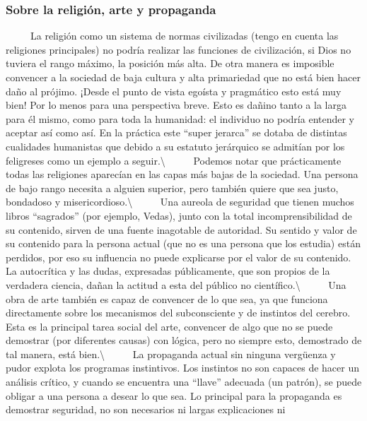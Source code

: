 \protect\hypertarget{M25}{}{}

\subsubsection{Sobre la religión, arte y
propaganda}\label{sobre-la-religiuxf3n-arte-y-propaganda}

~ ~ ~ La religión como un sistema de normas civilizadas (tengo en cuenta
las religiones principales) no podría realizar las funciones de
civilización, si Dios no tuviera el rango máximo, la posición más alta.
De otra manera es imposible convencer a la sociedad de baja cultura y
alta primariedad que no está bien hacer daño al prójimo. ¡Desde el punto
de vista egoísta y pragmático esto está muy bien! Por lo menos para una
perspectiva breve. Esto es dañino tanto a la larga para él mismo, como
para toda la humanidad: el individuo no podría entender y aceptar así
como así. En la práctica este ``super jerarca'' se dotaba de distintas
cualidades humanistas que debido a su estatuto jerárquico se admitían
por los feligreses como un ejemplo a seguir.\textbackslash{} ~ ~ ~
Podemos notar que prácticamente todas las religiones aparecían en las
capas más bajas de la sociedad. Una persona de bajo rango necesita a
alguien superior, pero también quiere que sea justo, bondadoso y
misericordioso.\textbackslash{} ~ ~ ~ Una aureola de seguridad que
tienen muchos libros ``sagrados'' (por ejemplo, Vedas), junto con la
total incomprensibilidad de su contenido, sirven de una fuente
inagotable de autoridad. Su sentido y valor de su contenido para la
persona actual (que no es una persona que los estudia) están perdidos,
por eso su influencia no puede explicarse por el valor de su contenido.
La autocrítica y las dudas, expresadas públicamente, que son propios de
la verdadera ciencia, dañan la actitud a esta del público no
científico.\textbackslash{} ~ ~ ~ Una obra de arte también es capaz de
convencer de lo que sea, ya que funciona directamente sobre los
mecanismos del subconsciente y de instintos del cerebro. Esta es la
principal tarea social del arte, convencer de algo que no se puede
demostrar (por diferentes causas) con lógica, pero no siempre esto,
demostrado de tal manera, está bien.\textbackslash{} ~ ~ ~ La propaganda
actual sin ninguna vergüenza y pudor explota los programas instintivos.
Los instintos no son capaces de hacer un análisis crítico, y cuando se
encuentra una ``llave'' adecuada (un patrón), se puede obligar a una
persona a desear lo que sea. Lo principal para la propaganda es
demostrar seguridad, no son necesarios ni largas explicaciones ni
